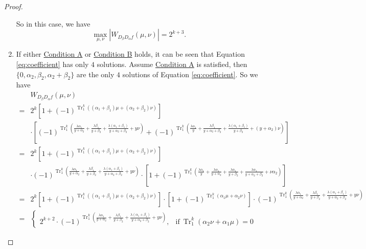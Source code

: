 \documentclass{article}
\newcommand{\0}{\textbf{0}}
\newcommand{\1}{\textbf{1}}
\newcommand{\TRACE}{\operatorname{Tr}_1^k}
\theoremstyle{plain}
\begin{document}
\begin{proof}
\begin{enumerate}[label=\textbf{Case \arabic*},wide = 0pt]
            So in this case, we have
            \[\max_{\mu,\nu}|W_{D_{\beta}D_{\alpha}f}(\mu,\nu)|=2^{k+3}.\]
            \item If either \hyperref[item_a]{\textsf{Condition A}} or \hyperref[item_b]{\textsf{Condition B}} holds,\label{case_3}
            it can be seen that Equation \eqref{eq:coefficient} has only $4$ solutions.
            Assume \hyperref[item_a]{\textsf{Condition A}} is satisfied, then $\{0,\alpha_2,\beta_2,\alpha_2+\beta_2\}$ are the only $4$ solutions of Equation \eqref{eq:coefficient}.
            So we have
            \begin{align}\label{eq:simpleforms_4}
                &W_{D_{\beta}D_{\alpha}f}(\mu,\nu)\nonumber\\
                =&2^k\left[1+(-1)^{\TRACE\left((\alpha_1+\beta_1)\mu+ (\alpha_2+\beta_2)\nu\right)}\right]\nonumber\\
                &\cdot
                \left[(-1)^{\TRACE\left(\frac{\lambda\alpha_1}{y+\alpha_2}+\frac{\lambda\beta_1}{y+\beta_2}+\frac{\lambda(\alpha_1+\beta_1)}{y+\alpha_2+\beta_2}+ y\nu\right)}+
                (-1)^{\TRACE\left(\frac{\lambda\alpha_1}{y}+\frac{\lambda\beta_1}{y+\alpha_2+\beta_2}+\frac{\lambda(\alpha_1+\beta_1)}{y+\beta_2}+ (y+\alpha_2)\nu\right)}\right]\nonumber\\
                =&2^k\left[1+(-1)^{\TRACE\left((\alpha_1+\beta_1)\mu+ (\alpha_2+\beta_2)\nu\right)}\right]\nonumber\\
                &\cdot
                (-1)^{\TRACE\left(\frac{\lambda\alpha_1}{y+\alpha_2}+\frac{\lambda\beta_1}{y+\beta_2}+\frac{\lambda(\alpha_1+\beta_1)}{y+\alpha_2+\beta_2}+ y\nu\right)}\cdot
                \left[1+(-1)^{\TRACE\left(\frac{\lambda\alpha_1}{y}+\frac{\lambda\alpha_1}{y+\alpha_2}+\frac{\lambda\alpha_1}{y+\beta_2}+\frac{\lambda\alpha_1}{y+\alpha_2+\beta_2}+\nu\alpha_2\right)}\right]\nonumber\\
                =&2^k\left[1+(-1)^{\TRACE\left((\alpha_1+\beta_1)\mu+ (\alpha_2+\beta_2)\nu\right)}\right]\cdot
                \left[1+(-1)^{\TRACE\left(\alpha_1\mu+\alpha_2\nu\right)}\right]\cdot
                (-1)^{\TRACE\left(\frac{\lambda\alpha_1}{y+\alpha_2}+\frac{\lambda\beta_1}{y+\beta_2}+\frac{\lambda(\alpha_1+\beta_1)}{y+\alpha_2+\beta_2}+ y\nu\right)}\nonumber\\
                =&\begin{cases}
                    2^{k+2}\cdot(-1)^{\TRACE\left(\frac{\lambda\alpha_1}{y+\alpha_2}+\frac{\lambda\beta_1}{y+\beta_2}+\frac{\lambda(\alpha_1+\beta_1)}{y+\alpha_2+\beta_2}+ y\nu\right)},&\text{if}~\TRACE\left(\alpha_2\nu+\alpha_1\mu\right)=0 ~

\end{cases}
\end{align}
\end{enumerate}
\end{proof}
\end{document}
